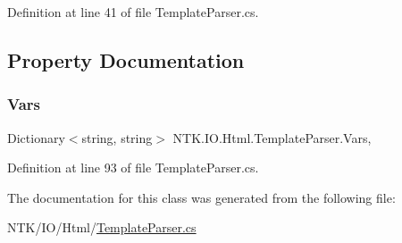 Definition at line 41 of file Template\+Parser.\+cs.



\subsection{Property Documentation}
\mbox{\label{class_n_t_k_1_1_i_o_1_1_html_1_1_template_parser_a48be89a9103c1e886ebcd41407483bfe}} 
\subsubsection{\texorpdfstring{Vars}{Vars}}
{\footnotesize\ttfamily Dictionary$<$string, string$>$ N\+T\+K.\+I\+O.\+Html.\+Template\+Parser.\+Vars\hspace{0.3cm}{\ttfamily [get]}, {\ttfamily [set]}}



Definition at line 93 of file Template\+Parser.\+cs.



The documentation for this class was generated from the following file\+:\begin{DoxyCompactItemize}
\item 
N\+T\+K/\+I\+O/\+Html/\mbox{\hyperlink{_template_parser_8cs}{Template\+Parser.\+cs}}\end{DoxyCompactItemize}
